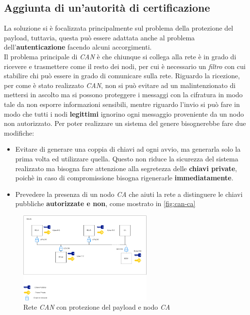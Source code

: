 \subsection{Aggiunta di un'autorità di certificazione}
La soluzione si è focalizzata principalmente sul problema della protezione del payload, tuttavia, questa può essere adattata anche al problema dell'\textbf{autenticazione} facendo alcuni accorgimenti.\\
Il problema principale di \emph{CAN} è che chiunque si collega alla rete è in grado di ricevere e trasmettere come il resto dei nodi, per cui è necessario un \emph{filtro} con cui stabilire chi può essere in grado di comunicare sulla rete. Riguardo la ricezione, per come è stato realizzato \emph{CAN}, non si può evitare ad un malintenzionato di mettersi in ascolto ma si possono proteggere i messaggi con la cifratura in modo tale da non esporre informazioni sensibili, mentre riguardo l'invio si può fare in modo che tutti i nodi \textbf{legittimi} ignorino ogni messaggio proveniente da un nodo non autorizzato. Per poter realizzare un sistema del genere bisognerebbe fare due modifiche:
\begin{itemize}
	\item Evitare di generare una coppia di chiavi ad ogni avvio, ma generarla solo la prima volta ed utilizzare quella. Questo non riduce la sicurezza del sistema realizzato ma bisogna fare attenzione alla segretezza delle \textbf{chiavi private}, poichè in caso di compromissione bisogna rigenerarle \textbf{immediatamente}.
	\item Prevedere la presenza di un nodo \emph{CA} che aiuti la rete a distinguere le chiavi pubbliche \textbf{autorizzate e non}, come mostrato in \autoref{fig:can-ca}
\end{itemize}

\begin{figure}[h]
	\centering
	\includegraphics[width=0.6\textwidth]{capitoli/figure-conclusioni/can-ca.png}
	\caption{Rete \emph{CAN} con protezione del payload e nodo \emph{CA}}
	\label{fig:can-ca}
\end{figure}

